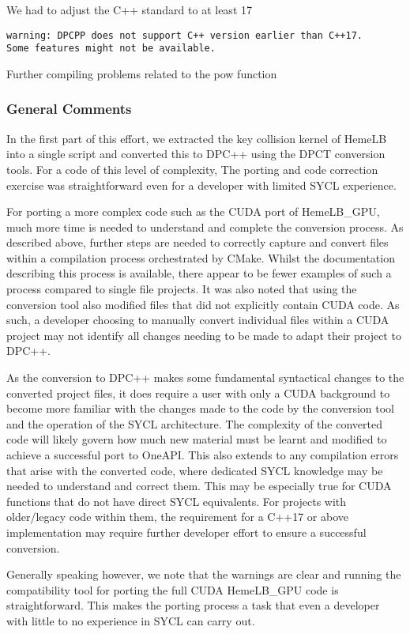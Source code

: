 \documentclass[../main]{subfiles}
\begin{document}
We had to adjust the C++ standard to at least 17
\begin{verbatim}
warning: DPCPP does not support C++ version earlier than C++17.
Some features might not be available.
\end{verbatim}

Further compiling problems related to the pow function

\subsubsection{General Comments}
In the first part of this effort, we extracted the key collision kernel of HemeLB into a single script and converted this to DPC++ using the  DPCT conversion tools.
For a code of this level of complexity, The porting and code correction exercise was straightforward even for a developer with limited SYCL experience.

For porting a more complex code such as the CUDA port of HemeLB\_GPU, much more time is needed to understand and complete the conversion process.
As described above, further steps are needed to correctly capture and convert files within a compilation process orchestrated by CMake.
Whilst the documentation describing this process is available, there appear to be fewer examples of such a process compared to single file projects.
It was also noted that using the conversion tool also modified files that did not explicitly contain CUDA code.
As such, a developer choosing to manually convert individual files within a CUDA project may not identify all changes needing to be made to adapt their project to DPC++.

As the conversion to DPC++ makes some fundamental syntactical changes to the converted project files, it does require a user with only a CUDA background to become more familiar with the changes made to the code by the conversion tool and the operation of the SYCL architecture.
The complexity of the converted code will likely govern how much new material must be learnt and modified to achieve a successful port to OneAPI.
This also extends to any compilation errors that arise with the converted code, where dedicated SYCL knowledge may be needed to understand and correct them.
This may be especially true for CUDA functions that do not have direct SYCL equivalents.
For projects with older/legacy code within them, the requirement for a C++17 or above implementation may require further developer effort to ensure a successful conversion.

Generally speaking however, we note that the warnings are clear and running the  compatibility tool for porting the full CUDA HemeLB\_GPU code is straightforward.
This makes the porting process a task that even a developer with little to no experience in SYCL can carry out.
\end{document}
